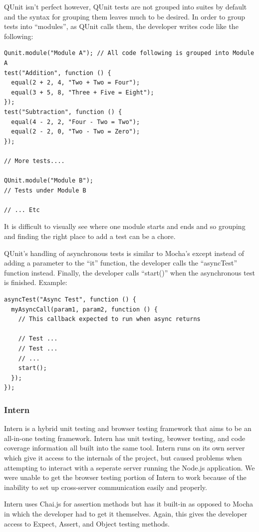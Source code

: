 \documentclass[11pt]{article}
\begin{document}
QUnit isn't perfect however, QUnit tests are not grouped into suites by default and the syntax for grouping them leaves much to be desired. In order to group tests into ``modules'', as QUnit calls them, the developer writes code like the following:
\begin{lstlisting}
Qunit.module("Module A"); // All code following is grouped into Module A
test("Addition", function () {
  equal(2 + 2, 4, "Two + Two = Four");
  equal(3 + 5, 8, "Three + Five = Eight");
});
test("Subtraction", function () {
  equal(4 - 2, 2, "Four - Two = Two");
  equal(2 - 2, 0, "Two - Two = Zero");
});

// More tests....

QUnit.module("Module B");
// Tests under Module B

// ... Etc
\end{lstlisting}
It is difficult to visually see where one module starts and ends and so grouping and finding the right place to add a test can be a chore.

QUnit's handling of asynchronous tests is similar to Mocha's except instead of adding a parameter to the ``it'' function, the developer calls the ``asyncTest'' function instead. Finally, the developer calls ``start()'' when the asynchronous test is finished. Example:
\begin{lstlisting}
asyncTest("Async Test", function () {
  myAsyncCall(param1, param2, function () {
    // This callback expected to run when async returns

    // Test ...
    // Test ...
    // ...
    start();
  });
});
\end{lstlisting}

\subsubsection{Intern\cite{InternIO}}
Intern is a hybrid unit testing and browser testing framework that aims to be an all-in-one testing framework. Intern has unit testing, browser testing, and code coverage information all built into the same tool. Intern runs on its own server which give it access to the internals of the project, but caused problems when attempting to interact with a seperate server running the Node.js application. We were unable to get the browser testing portion of Intern to work because of the inability to set up cross-server communication easily and properly.

Intern uses Chai.js for assertion methods but has it built-in as opposed to Mocha in which the developer had to get it themselves. Again, this gives the developer access to Expect, Assert, and Object testing methods.
\end{document}
